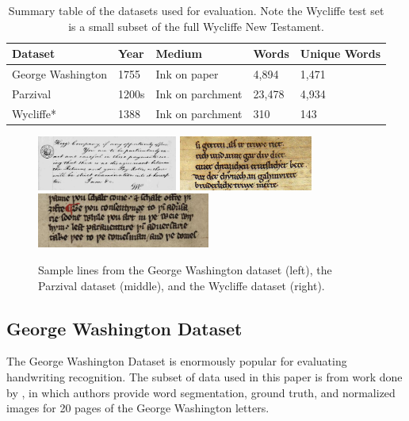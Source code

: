 \documentclass[final]{ukthesis}
\begin{document}
\begin{table}[h]
\centering
\begin{tabular}{lllll}
\textbf{Dataset}  & \textbf{Year} & \textbf{Medium}  & \textbf{Words} & \textbf{Unique Words} \\
\hline
George Washington & 1755                  & Ink on paper     & 4,894          & 1,471                 \\
Parzival          & 1200s                 & Ink on parchment & 23,478         & 4,934                 \\
Wycliffe*         & 1388                  & Ink on parchment & 310            & 143                  
\end{tabular}
\caption{Summary table of the datasets used for evaluation. Note the Wycliffe test set is a small subset of the full Wycliffe New Testament.}
\label{table:datasets}
\end{table}

\begin{figure}[t]
\begin{center}
\includegraphics[height=1.8cm]{gw-sample}
\includegraphics[height=1.8cm]{parzival-sample}
\includegraphics[height=1.8cm]{wycliffe-sample}
\end{center}
\caption{Sample lines from the George Washington dataset (left), the Parzival dataset (middle), and the Wycliffe dataset (right).}
\label{fig:dataset-samples}
\end{figure}


\subsection{George Washington Dataset}
The George Washington Dataset is enormously popular for evaluating handwriting recognition. The subset of data used in this paper is from work done by \cite{fischer2012lexicon}, in which authors provide word segmentation, ground truth, and normalized images for 20 pages of the George Washington letters.
\end{document}
